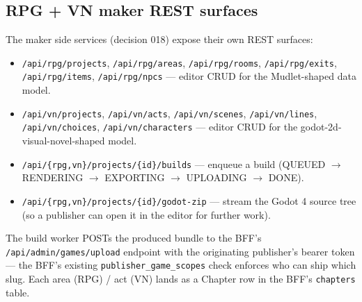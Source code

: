 \subsection{RPG + VN maker REST surfaces}

The maker side services (decision 018) expose their own REST surfaces:

\begin{itemize}
  \item \texttt{/api/rpg/projects}, \texttt{/api/rpg/areas},
        \texttt{/api/rpg/rooms}, \texttt{/api/rpg/exits},
        \texttt{/api/rpg/items}, \texttt{/api/rpg/npcs} --- editor
        CRUD for the Mudlet-shaped data model.
  \item \texttt{/api/vn/projects}, \texttt{/api/vn/acts},
        \texttt{/api/vn/scenes}, \texttt{/api/vn/lines},
        \texttt{/api/vn/choices}, \texttt{/api/vn/characters} ---
        editor CRUD for the godot-2d-visual-novel-shaped model.
  \item \texttt{/api/\{rpg,vn\}/projects/\{id\}/builds} --- enqueue a
        build (QUEUED $\rightarrow$ RENDERING $\rightarrow$
        EXPORTING $\rightarrow$ UPLOADING $\rightarrow$ DONE).
  \item \texttt{/api/\{rpg,vn\}/projects/\{id\}/godot-zip} --- stream
        the Godot 4 source tree (so a publisher can open it in the
        editor for further work).
\end{itemize}

The build worker POSTs the produced bundle to the BFF's
\texttt{/api/admin/games/upload} endpoint with the originating
publisher's bearer token --- the BFF's existing
\texttt{publisher\_game\_scopes} check enforces who can ship which
slug. Each area (RPG) / act (VN) lands as a Chapter row in the BFF's
\texttt{chapters} table.
